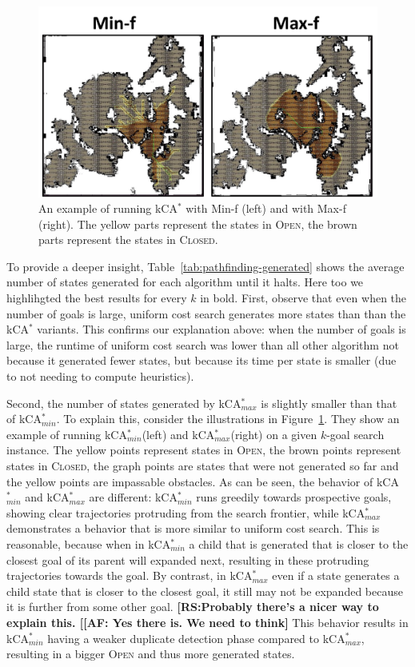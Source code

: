 \documentclass{aicom2e}
\newcommand{\kgs}{$k$-goal search}
\newcommand{\kastar}{kCA$^*$}
\newcommand{\kastarmin}{kCA$^*_{min}$}
\newcommand{\kastarmax}{kCA$^*_{max}$}
\newcommand{\minf}{Min-f}
\newcommand{\maxf}{Max-f}
\newcommand{\open}{\textsc{Open}}
\newcommand{\closed}{\textsc{Closed}}
\newcommand{\roni}[1]{\textbf{[RS:#1]}}
\begin{document}
\begin{figure}
    \includegraphics[width=\columnwidth]{min-vs-max}
    \caption{An example of running \kastar{} with \minf{} (left) and with \maxf{} (right). The yellow parts represent the states in \open{}, the brown parts represent the states in \closed{}.}
    \label{fig:min-vs-max}
\end{figure}


To provide a deeper insight, Table~\ref{tab:pathfinding-generated} shows the
average number of states generated for each algorithm until it halts. Here too
we highlihgted the best results for every $k$ in bold. First, observe that even
when the number of goals is large, uniform cost search generates more states
than than the \kastar{} variants. This confirms our explanation above: when the
number of goals is large, the  runtime of uniform cost search was lower than
all other algorithm not because it generated fewer states, but because its time
per state is smaller (due to not needing to compute heuristics).


Second, the number of states generated by \kastarmax{} is slightly smaller than
that of \kastarmin{}. To explain this, consider the illustrations in
Figure~\ref{fig:min-vs-max}. They show an example of running \kastarmin{}(left)
and  \kastarmax{}(right) on a given \kgs{} instance. The yellow points
represent states in \open{}, the brown points represent states in \closed{},
the graph points are states that were not generated so far and the yellow
points are impassable obstacles. As can be seen, the behavior of \kastarmin{}
and \kastarmax{} are different: \kastarmin{} runs greedily towards prospective
goals, showing clear trajectories protruding from the search frontier, while
\kastarmax{} demonstrates a behavior that is more similar to uniform cost
search. This is reasonable, because when in \kastarmin{} a child that is
generated that is closer to the closest goal of its parent will expanded next,
resulting in these protruding trajectories towards the goal. By contrast, in
\kastarmax{} even if a state generates a child state that is closer to the
closest goal, it still may not be expanded because it is further from some
other goal. \roni{Probably there's a nicer way to explain this. [[AF: Yes there
is. We need to think} This behavior results in \kastarmin{} having a weaker
duplicate detection phase compared to \kastarmax, resulting in a bigger \open{}
and thus more generated states.
\end{document}
